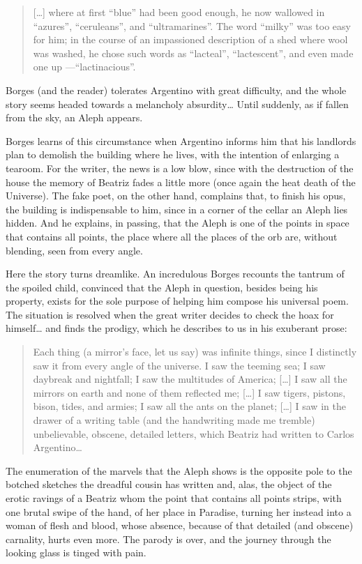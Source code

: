 \documentclass[11pt,a4paper]{article}
\begin{document}
\begin{quotation}
[…] where at first ``blue'' had been good enough, he now wallowed in ``azures'', ``ceruleans'', and ``ultramarines''. The word ``milky'' was too easy for him; in the course of an impassioned description of a shed where wool was washed, he chose such words as ``lacteal'', ``lactescent'', and even made one up ---``lactinacious''.
\end{quotation}

Borges (and the reader) tolerates Argentino with great difficulty, and the whole story seems headed towards a melancholy absurdity… Until suddenly, as if fallen from the sky, an Aleph appears.

Borges learns of this circumstance when Argentino informs him that his landlords plan to demolish the building where he lives, with the intention of enlarging a tearoom. For the writer, the news is a low blow, since with the destruction of the house the memory of Beatriz fades a little more (once again the heat death of the Universe). The fake poet, on the other hand, complains that, to finish his opus, the building is indispensable to him, since in a corner of the cellar an Aleph lies hidden. And he explains, in passing, that the Aleph is one of the points in space that contains all points, the place where all the places of the orb are, without blending, seen from every angle.

Here the story turns dreamlike. An incredulous Borges recounts the tantrum of the spoiled child, convinced that the Aleph in question, besides being his property, exists for the sole purpose of helping him compose his universal poem. The situation is resolved when the great writer decides to check the hoax for himself… and finds the prodigy, which he describes to us in his exuberant prose:

\begin{quotation}
Each thing (a mirror's face, let us say) was infinite things, since I distinctly saw it from every angle of the universe. I saw the teeming sea; I saw daybreak and nightfall; I saw the multitudes of America; […] I saw all the mirrors on earth and none of them reflected me; […] I saw tigers, pistons, bison, tides, and armies; I saw all the ants on the planet; […] I saw in the drawer of a writing table (and the handwriting made me tremble) unbelievable, obscene, detailed letters, which Beatriz had written to Carlos Argentino…
\end{quotation}

The enumeration of the marvels that the Aleph shows is the opposite pole to the botched sketches the dreadful cousin has written and, alas, the object of the erotic ravings of a Beatriz whom the point that contains all points strips, with one brutal swipe of the hand, of her place in Paradise, turning her instead into a woman of flesh and blood, whose absence, because of that detailed (and obscene) carnality, hurts even more. The parody is over, and the journey through the looking glass is tinged with pain.
\end{document}
